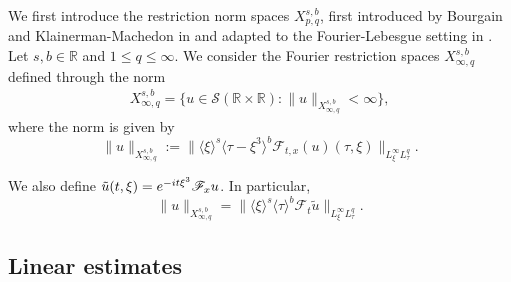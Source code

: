 \documentclass[a4paper, 11pt]{amsart}
\newcommand{\R}{\mathbb{R}}
\newcommand{\jap}[1]{\langle #1 \rangle}
\theoremstyle{plain}
\theoremstyle{definition}
\theoremstyle{remark}
\newcommand{\5}{\text{V}}
\newcommand{\F}{\mathcal{F}}
\numberwithin{equation}{section}
\theoremstyle{mytheoremstyle} \newtheorem{nota}[thm]{Remark}
\theoremstyle{mytheoremstyle} \newtheorem{exemplo}[thm]{Example}
\begin{document}
We first introduce the restriction norm spaces $X^{s,b}_{p,q}$, first introduced by Bourgain and Klainerman-Machedon in \cite{} and adapted to the Fourier-Lebesgue setting in \cite{GH08}.
%
%
Let $s,b\in \R$ and $1\le q \le \infty$. We consider the Fourier restriction spaces $X^{s,b}_{\infty,q}$ defined through the norm
\begin{align*}
X^{s,b}_{\infty,q} =\{ u\in \mathcal{S}(\R\times \R) : \|u\|_{X^{s,b}_{\infty,q}}<\infty\},
\end{align*}
where the norm is given by
\begin{equation}
\| u \|_{X^{s,b}_{\infty,q}} := \| \jap{\xi}^s \jap{\tau-\xi^3}^b \F_{t,x}(u) (\tau, \xi) \|_{L^\infty_\xi L^q_\tau}.
\end{equation}

We also define $\Tilde{u}(t,\xi)=e^{-it\xi^3}\mathcal{F}_xu$. In particular,
$$
\|u\|_{X^{s,b}_{\infty,q}} = \|\jap{\xi}^s\jap{\tau}^b\mathcal{F}_t\tilde{u}\|_{L^\infty_\xi L^q_\tau}.
$$

\subsection{Linear estimates}
\end{document}
